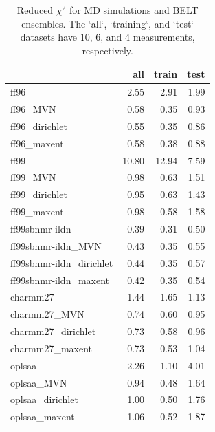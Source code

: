 \documentclass[12pt]{article}
\begin{document}
\begin{table}

\begin{tabular}{lrrr}
\toprule
{} &   all &  train &  test \\
\midrule
ff96                     &  2.55 &   2.91 &  1.99 \\
ff96\_MVN                 &  0.58 &   0.35 &  0.93 \\
ff96\_dirichlet           &  0.55 &   0.35 &  0.86 \\
ff96\_maxent              &  0.58 &   0.38 &  0.88 \\
\toprule
ff99                     & 10.80 &  12.94 &  7.59 \\
ff99\_MVN                 &  0.98 &   0.63 &  1.51 \\
ff99\_dirichlet           &  0.95 &   0.63 &  1.43 \\
ff99\_maxent              &  0.98 &   0.58 &  1.58 \\
\toprule
ff99sbnmr-ildn           &  0.39 &   0.31 &  0.50 \\
ff99sbnmr-ildn\_MVN       &  0.43 &   0.35 &  0.55 \\
ff99sbnmr-ildn\_dirichlet &  0.44 &   0.35 &  0.57 \\
ff99sbnmr-ildn\_maxent    &  0.42 &   0.35 &  0.54 \\
\toprule
charmm27                    &  1.44 &   1.65 &  1.13 \\
charmm27\_MVN                &  0.74 &   0.60 &  0.95 \\
charmm27\_dirichlet          &  0.73 &   0.58 &  0.96 \\
charmm27\_maxent             &  0.73 &   0.53 &  1.04 \\
\toprule
oplsaa                      &  2.26 &   1.10 &  4.01 \\
oplsaa\_MVN                  &  0.94 &   0.48 &  1.64 \\
oplsaa\_dirichlet            &  1.00 &   0.50 &  1.76 \\
oplsaa\_maxent               &  1.06 &   0.52 &  1.87 \\
\bottomrule
\end{tabular}

\caption{
Reduced $\chi^2$ for MD simulations and BELT ensembles.  The `all`, `training`, and `test` datasets have 10, 6, and 4 measurements, respectively.  
}
\end{table}


\newpage
\end{document}
